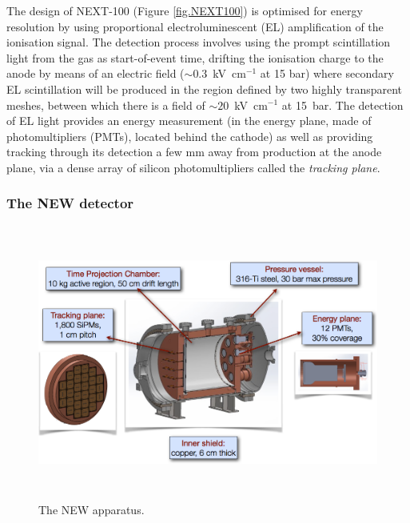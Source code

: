 \documentclass[a4paper,11pt,oneside]{article}
\begin{document}
The design of NEXT-100 (Figure \ref{fig.NEXT100}) is optimised for energy resolution by using proportional electroluminescent (EL) amplification of the ionisation signal. The detection process involves using the prompt scintillation light from the gas as start-of-event time, drifting the ionisation charge to the anode by means of an electric field ($\sim0.3$~kV~cm$^{-1}$ at 15 bar) where secondary EL scintillation will be produced in the region defined by two highly transparent meshes, between which there is a field of $\sim20$~kV~cm$^{-1}$ at 15~bar. The detection of EL light provides an energy measurement (in the energy plane, made of photomultipliers (PMTs), located behind the cathode) as well as providing tracking through its detection a few mm away from production at the anode plane, via a dense array of silicon photomultipliers called the \emph{tracking plane}.

\subsubsection*{The NEW detector}
\label{sec.new}
\begin{figure}
\centering
\includegraphics[height=9cm]{img/NEW.png}
\caption{The NEW apparatus.} \label{fig:NEW}
\end{figure}
\end{document}
